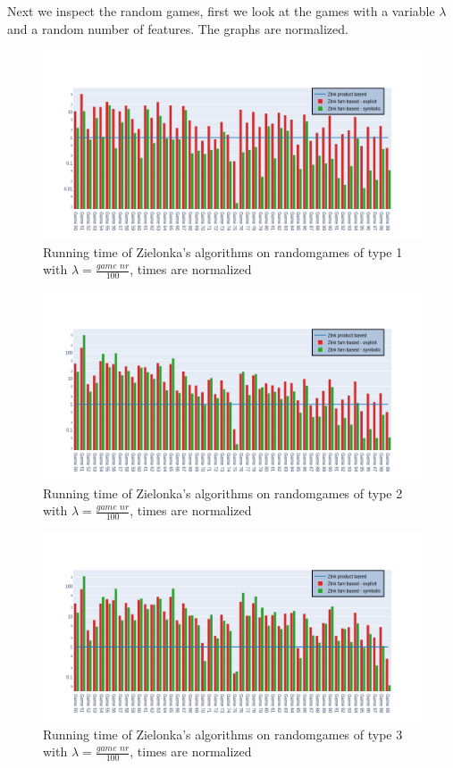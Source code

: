 Next we inspect the random games, first we look at the games with a variable $\lambda$ and a random number of features. The graphs are normalized.
\begin{figure}[H]
\includegraphics[width=1\linewidth]{"results/FF_randomgames/Zlnk product based_Zlnk fam based - explicit_Zlnk fam based - symbolic_"}
\caption{Running time of Zielonka's algorithms on randomgames of type 1 with $\lambda = \frac{\textit{game nr}}{100}$, times are normalized}
\label{fig:elevatorzlnks}
\end{figure}%
\begin{figure}[H]
\includegraphics[width=1\linewidth]{"results/FC_randomgames/Zlnk product based_Zlnk fam based - explicit_Zlnk fam based - symbolic_"}
\caption{Running time of Zielonka's algorithms on randomgames of type 2 with $\lambda = \frac{\textit{game nr}}{100}$, times are normalized}
\label{fig:elevatorzlnks}
\end{figure}%
\begin{figure}[H]
\includegraphics[width=1\linewidth]{"results/BC_randomgames/Zlnk product based_Zlnk fam based - explicit_Zlnk fam based - symbolic_"}
\caption{Running time of Zielonka's algorithms on randomgames of type 3 with $\lambda = \frac{\textit{game nr}}{100}$, times are normalized}
\label{fig:elevatorzlnks}
\end{figure}%
